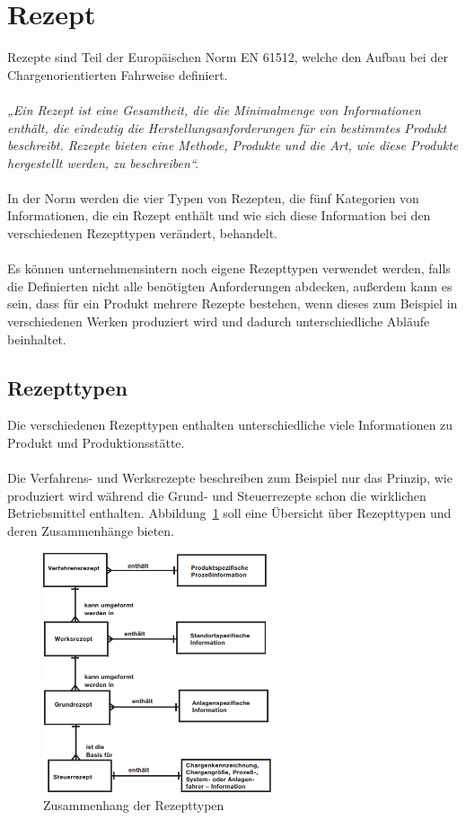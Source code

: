 \section{Rezept}
Rezepte sind Teil der Europäischen Norm \acs{EN} 61512, welche den Aufbau bei der Chargenorientierten Fahrweise definiert.\\\\
\textit{„Ein Rezept ist eine Gesamtheit, die die Minimalmenge von Informationen enthält, die eindeutig die Herstellungsanforderungen für ein bestimmtes Produkt beschreibt. Rezepte bieten eine Methode, Produkte und die Art, wie diese Produkte hergestellt werden, zu beschreiben“.} \cite{en61512}\\\\
In der Norm werden die vier Typen von Rezepten, die fünf Kategorien von Informationen, die ein Rezept enthält und wie sich diese Information bei den verschiedenen Rezepttypen verändert, behandelt.\\\\
Es können unternehmensintern noch eigene Rezepttypen verwendet werden, falls die Definierten nicht alle benötigten Anforderungen abdecken, außerdem kann es sein, dass für ein Produkt mehrere Rezepte bestehen, wenn dieses zum Beispiel in verschiedenen Werken produziert wird und dadurch unterschiedliche Abläufe beinhaltet.\\

\subsection{Rezepttypen}

Die verschiedenen Rezepttypen enthalten unterschiedliche viele Informationen zu Produkt und Produktionsstätte.\\\\
Die Verfahrens- und Werksrezepte beschreiben zum Beispiel nur das Prinzip, wie produziert wird während die Grund- und Steuerrezepte schon die wirklichen Betriebsmittel enthalten. Abbildung~\ref{fig:rezepttypen} soll eine Übersicht über Rezepttypen und deren Zusammenhänge bieten.
\newpage
\begin{figure}[h!]
		\centering
		\includegraphics[width=0.6\textwidth]{graphics/stateoftheart/rezepttypen.png}
		\caption{Zusammenhang der Rezepttypen \cite{en61512}}
		\label{fig:rezepttypen}
\end{figure}

